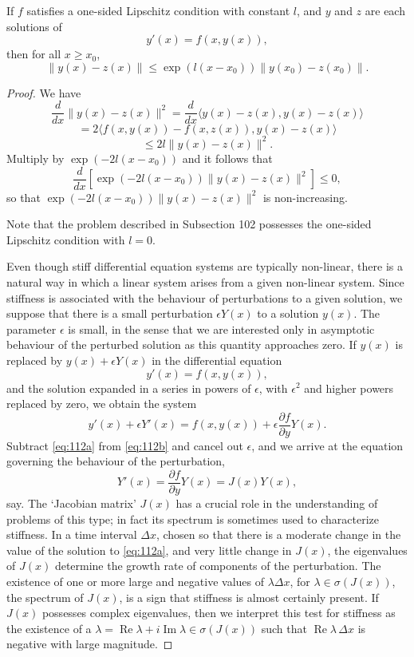 \begin{theorem}

  \label{thm:112B}
If \( f \) satisfies a one-sided Lipschitz condition with constant \( l \), and \( y \) and \( z \) are each solutions of
\[
y'(x) = f(x, y(x)),
\]
then for all \( x \geq x_0 \),
\[
\| y(x) - z(x) \| \leq \exp(l(x - x_0)) \| y(x_0) - z(x_0) \|.
\]
\end{theorem}

\begin{proof}
We have
\[
\frac{d}{dx} \| y(x) - z(x) \|^2 = \frac{d}{dx} \langle y(x) - z(x), y(x) - z(x) \rangle
\]
\[
= 2 \langle f(x, y(x)) - f(x, z(x)), y(x) - z(x) \rangle
\]
\[
\leq 2l \| y(x) - z(x) \|^2.
\]
Multiply by \( \exp(-2l(x - x_0)) \) and it follows that
\[
\frac{d}{dx} \left[ \exp(-2l(x - x_0)) \| y(x) - z(x) \|^2 \right] \leq 0,
\]
so that \( \exp(-2l(x - x_0)) \| y(x) - z(x) \|^2 \) is non-increasing.

Note that the problem described in Subsection 102 possesses the one-sided Lipschitz condition with \( l = 0 \).

Even though stiff differential equation systems are typically non-linear, there is a natural way in which a linear system arises from a given non-linear system. Since stiffness is associated with the behaviour of perturbations to a given solution, we suppose that there is a small perturbation \( \epsilon Y(x) \) to a solution \( y(x) \). The parameter \( \epsilon \) is small, in the sense that we are interested only in asymptotic behaviour of the perturbed solution as this quantity approaches zero. If \( y(x) \) is replaced by \( y(x) + \epsilon Y(x) \) in the differential equation
\[
y'(x) = f(x, y(x)), \tag{112a}
\]
and the solution expanded in a series in powers of \( \epsilon \), with \( \epsilon^2 \) and higher powers replaced by zero, we obtain the system
\[
y'(x) + \epsilon Y'(x) = f(x, y(x)) + \epsilon \frac{\partial f}{\partial y} Y(x). \tag{112b}
\]
Subtract \eqref{eq:112a} from \eqref{eq:112b} and cancel out \( \epsilon \), and we arrive at the equation governing the behaviour of the perturbation,
\[
Y'(x) = \frac{\partial f}{\partial y} Y(x) = J(x) Y(x),
\]
say. The `Jacobian matrix' \( J(x) \) has a crucial role in the understanding of problems of this type; in fact its spectrum is sometimes used to characterize stiffness. In a time interval \( \Delta x \), chosen so that there is a moderate change in the value of the solution to \eqref{eq:112a}, and very little change in \( J(x) \), the eigenvalues of \( J(x) \) determine the growth rate of components of the perturbation. The existence of one or more large and negative values of \( \lambda \Delta x \), for \( \lambda \in \sigma(J(x)) \), the spectrum of \( J(x) \), is a sign that stiffness is almost certainly present. If \( J(x) \) possesses complex eigenvalues, then we interpret this test for stiffness as the existence of a \( \lambda = \operatorname{Re} \lambda + i \operatorname{Im} \lambda \in \sigma(J(x)) \) such that \( \operatorname{Re} \lambda \, \Delta x \) is negative with large magnitude.
\end{proof}

